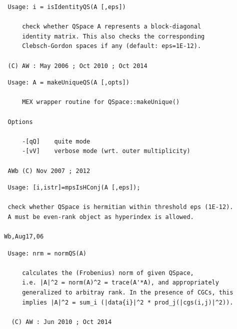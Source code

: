 \documentclass[twoside,12pt]{article}
\begin{document}

\begin{verbatim}
   Usage: i = isIdentityQS(A [,eps])
 
       check whether QSpace A represents a block-diagonal
       identity matrix. This also checks the corresponding
       Clebsch-Gordon spaces if any (default: eps=1E-12).
 
   (C) AW : May 2006 ; Oct 2010 ; Oct 2014
\end{verbatim}

\pagebreak[3]



\begin{verbatim}
   Usage: A = makeUniqueQS(A [,opts])
 
       MEX wrapper routine for QSpace::makeUnique()
 
   Options
 
       -[qQ]    quite mode
       -[vV]    verbose mode (wrt. outer multiplicity)
 
   AWb (C) Nov 2007 ; 2012
\end{verbatim}

\pagebreak[3]



\begin{verbatim}
   Usage: [i,istr]=mpsIsHConj(A [,eps]);
 
   check whether QSpace is hermitian within threshold eps (1E-12).
   A must be even-rank object as hyperindex is allowed.
 
  Wb,Aug17,06
\end{verbatim}

\pagebreak[3]



\begin{verbatim}
   Usage: nrm = normQS(A)
 
       calculates the (Frobenius) norm of given QSpace,
       i.e. |A|^2 = norm(A)^2 = trace(A'*A), and appropriately
       generalized to arbitray rank. In the presence of CGCs, this
       implies |A|^2 = sum_i (|data{i}|^2 * prod_j(|cgs(i,j)|^2)).
 
    (C) AW : Jun 2010 ; Oct 2014
\end{verbatim}

\pagebreak[3]


\end{document}
